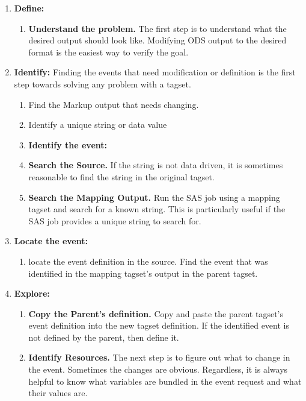 \begin{enumerate}
\item {\bfseries Define:}
\begin{enumerate}
\item {\bfseries Understand the problem.}
The first step is to understand what the desired output should look
like.  Modifying ODS output to the desired format is the easiest way
to verify the goal.
\end{enumerate}

\item {\bfseries Identify:}
Finding the events that need modification or definition is the 
first step towards solving any problem with a tagset.  
\begin{enumerate}
\item Find the Markup output that needs changing.
\item Identify a unique string or data value
\item {\bfseries Identify the event:}
\item {\bfseries Search the Source.}
If the string is not data driven, it is sometimes reasonable to
find the string in the original tagset.
\item {\bfseries Search the Mapping Output.}
Run the SAS job using a mapping tagset and search for a known string.
This is particularly useful if the SAS job provides a unique string to 
search for.
\end{enumerate}

\item {\bfseries Locate the event:}
\begin{enumerate}
\item locate the event definition in the source.
Find the event that was identified in the mapping tagset's output in the parent tagset.
\end{enumerate}

\item {\bfseries Explore:}
\begin{enumerate}
\item {\bfseries Copy the Parent's definition.}
Copy and paste the parent tagset's event definition into the new 
tagset definition. If the identified event is not defined by the parent, 
then define it. 

\item {\bfseries Identify Resources.}
The next step is to figure out what to change in the event.  Sometimes
the changes are obvious.  Regardless, it is always helpful to know 
what variables are bundled in the event request and what their values 
are.  


\end{enumerate}
\end{enumerate}
